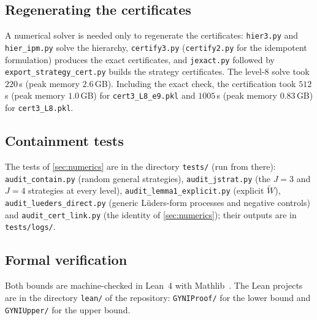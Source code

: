 \documentclass[aps,pra,onecolumn,notitlepage,superscriptaddress,longbibliography,nofootinbib,11pt]{revtex4-2}
\theoremstyle{remark}
\newcommand{\file}[1]{\texttt{#1}}
\begin{document}
\subsection{Regenerating the certificates}

A numerical solver is needed only to regenerate the certificates: \file{hier3.py} and \file{hier\_ipm.py} solve the hierarchy, \file{certify3.py} (\file{certify2.py} for the idempotent formulation) produces the exact certificates, and \file{jexact.py} followed by \file{export\_strategy\_cert.py} builds the strategy certificates.
The level-8 solve took $220$\,s (peak memory $2.6$\,GB). Including the exact check, the certification took $512$\,s (peak memory $1.0$\,GB) for \file{cert3\_L8\_e9.pkl} and $1005$\,s (peak memory $0.83$\,GB) for \file{cert3\_L8.pkl}.

\subsection{Containment tests}

The tests of \ref{sec:numerics} are in the directory \file{tests/} (run from there): \file{audit\_contain.py} (random general strategies), \file{audit\_jstrat.py} (the $J=3$ and $J=4$ strategies at every level), \file{audit\_lemma1\_explicit.py} (explicit $\widetilde W$), \file{audit\_lueders\_direct.py} (generic L\"uders-form processes and negative controls) and \file{audit\_cert\_link.py} (the identity of \ref{sec:numerics}); their outputs are in \file{tests/logs/}.

\subsection{Formal verification}\label{sec:lean-formal}

Both bounds are machine-checked in Lean~4 with Mathlib~\cite{Lean4}. The Lean projects are in the directory \file{lean/} of the repository: \file{GYNIProof/} for the lower bound and \file{GYNIUpper/} for the upper bound.
\end{document}
